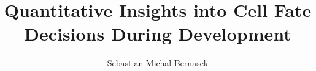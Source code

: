\documentclass[12pt,reqno]{nuthesis}	%
\author{Sebastian Michal Bernasek}
\title{Quantitative Insights into Cell Fate Decisions During Development}
\begin{document}
%
%


\frontmatter		%

\maketitle		%

\copyrightpage		%


\abstract       %




\acknowledgements	%




\clearpage{} %
\tableofcontents	%

\clearpage{} %
\listoftables		%

\clearpage{} %
\listoffigures		%



\mainmatter             




%


%
%

%
\begin{singlespace}
\bibsep 12pt


\end{singlespace}

\appendix


\end{document}
